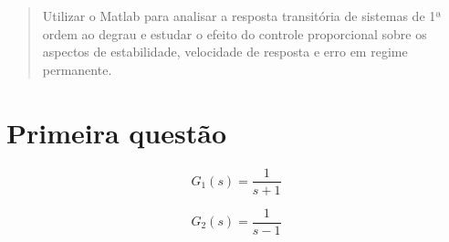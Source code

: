 \documentclass[paper=a4, fontsize=11pt]{article}
\begin{document}
\begin{abstract}
Utilizar o Matlab para analisar a resposta transitória de sistemas de 1ª ordem
ao degrau e estudar o efeito do controle proporcional sobre os aspectos de
estabilidade, velocidade de resposta e erro em regime permanente.
\end{abstract}


\newpage

\section{Primeira questão}

\begin{equation}
    G_1(s) = \frac{1}{s+1}
\end{equation}

\begin{equation}
    G_2(s) = \frac{1}{s-1}
\end{equation}
\end{document}
